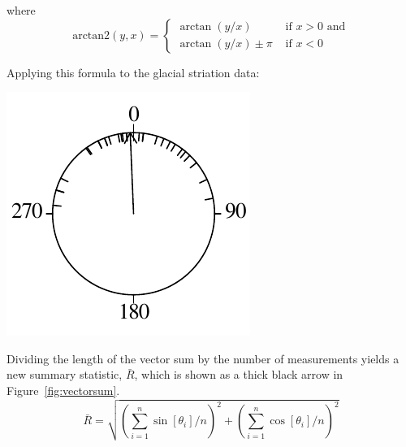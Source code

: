 \noindent where
\begin{equation}
  \mbox{arctan2}(y,x) = 
  \begin{cases}
    \arctan(y/x) & \mbox{~if~} x>0 \mbox{~and} \\
    \arctan(y/x) \pm \pi & \mbox{~if~} x<0
  \end{cases}
\end{equation}

Applying this formula to the glacial striation data:

\noindent\begin{minipage}[t][][b]{.25\textwidth}
\includegraphics[]{../figures/circle3.pdf}\medskip
\end{minipage}
\begin{minipage}[t][][t]{.75\textwidth}
  \label{fig:circle3}
\end{minipage}

Dividing the length of the vector sum by the number of measurements
yields a new summary statistic, $\bar{R}$, which is shown as a thick
black arrow in Figure~\ref{fig:vectorsum}.
\begin{equation}
  \bar{R} = \sqrt{\left(\sum_{i=1}^{n} \sin[\theta_i]/n\right)^2 +
    \left( \sum_{i=1}^{n}\cos[\theta_i]/n \right)^2}
  \label{eq:circularR}
\end{equation}

